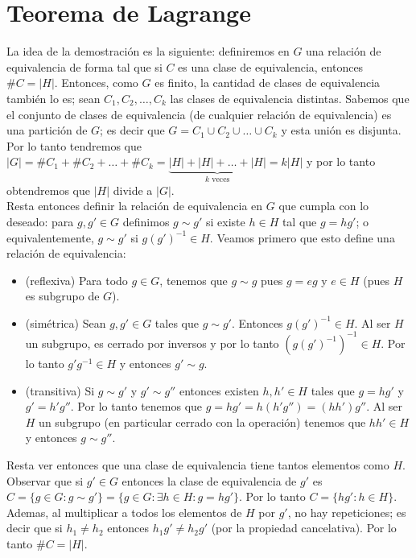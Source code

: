 \documentclass{report}
\begin{document}
\newpage\section{Teorema de Lagrange}
\begin{myproof}
    La idea de la demostración es la siguiente: definiremos en $G$ una relación de equivalencia de forma tal que si $C$ es una clase de equivalencia, entonces $\#C=|H|$. Entonces, como $G$ es finito, la cantidad de clases de equivalencia también lo es; sean $C_1,C_2,\dots,C_k$ las clases de equivalencia distintas. Sabemos que el conjunto de clases de equivalencia (de cualquier relación de equivalencia) es una partición de $G$; es decir que $G=C_1\cup C_2\cup\dots\cup C_k$ y esta unión es disjunta. Por lo tanto tendremos que $|G|=\#C_1+\#C_2+\dots+\#C_k=\underbrace{|H|+|H|+\dots+|H|}_\text{$k$ veces}=k|H|$ y por lo tanto obtendremos que $|H|$ divide a $|G|$.\\Resta entonces definir la relación de equivalencia en $G$ que cumpla con lo deseado: para $g,g'\in G$ definimos $g\sim g'$ si existe $h\in H$ tal que $g=hg'$; o equivalentemente, $g\sim g'$ si $g(g')^{-1}\in H$. Veamos primero que esto define una relación de equivalencia:
    \begin{itemize}
        \item (reflexiva) Para todo $g\in G$, tenemos que $g\sim g$ pues $g=eg$ y $e\in H$ (pues $H$ es subgrupo de $G$).
        \item (simétrica) Sean $g,g'\in G$ tales que $g\sim g'$. Entonces $g(g')^{-1}\in H$. Al ser $H$ un subgrupo, es cerrado por inversos y por lo tanto $(g(g')^{-1})^{-1}\in H$. Por lo tanto $g'g^{-1}\in H$ y entonces $g'\sim g$.
        \item (transitiva) Si $g\sim g'$ y $g'\sim g''$ entonces existen $h,h'\in H$ tales que $g=hg'$ y $g'=h'g''$. Por lo tanto tenemos que $g=hg'=h(h'g'')=(hh')g''$. Al ser $H$ un subgrupo (en particular cerrado con la operación) tenemos que $hh'\in H$ y entonces $g\sim g''$.
    \end{itemize}
    Resta ver entonces que una clase de equivalencia tiene tantos elementos como $H$. Observar que si $g'\in G$ entonces la clase de equivalencia de $g'$ es $C=\{g\in G:g\sim g'\}=\{g\in G:\exists h\in H: g=hg'\}$. Por lo tanto $C=\{hg':h\in H\}$. Ademas, al multiplicar a todos los elementos de $H$ por $g'$, no hay repeticiones; es decir que si $h_1\neq h_2$ entonces $h_1g'\neq h_2g'$ (por la propiedad cancelativa). Por lo tanto $\#C=|H|$.
\end{myproof}
\end{document}
